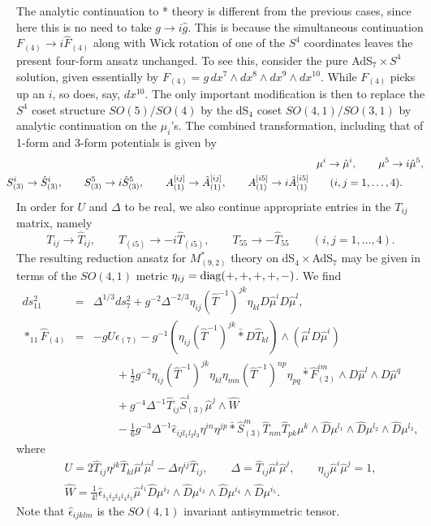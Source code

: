 \documentclass[a4paper,12pt]{article}
\newcommand{\ft}[2]{{\textstyle\frac{#1}{#2}}}
\begin{document}
The analytic continuation to * theory is different from the previous
cases, since here this is no need to take $g\to i\hat g$.  This is
because the simultaneous continuation $F_{(4)}\to i\hat F_{(4)}$ along
with Wick rotation of one of the $S^4$ coordinates leaves the present
four-form ansatz unchanged.  To see this, consider the
pure AdS$_7\times S^4$ solution, given essentially by $F_{(4)}=
g\, dx^7\wedge dx^8\wedge dx^9\wedge dx^{10}$.  While $F_{(4)}$ picks up
an $i$, so does, say, $dx^{10}$.  The only important modification is
then to replace the $S^4$ coset structure $SO(5)/SO(4)$ by the dS$_4$
coset $SO(4,1)/SO(3,1)$ by analytic continuation on the $\mu_i$'s.
The combined transformation, including that of 1-form and 3-form potentials
is given by
%
\begin{eqnarray}
&&\kern-2em
\mu^i\to \hat \mu^i,\qquad \mu^5\to i\hat\mu^5,\nonumber\\
&&\kern-2em
S_{(3)}^i\to \hat S_{(3)}^i, \qquad S_{(3)}^5\to i\hat S_{(3)}^5,\qquad
A_{(1)}^{[ij]}\to \hat A_{(1)}^{[ij]},\qquad
A_{(1)}^{[i5]}\to i\hat A_{(1)}^{[i5]}\qquad (i,j=1,\ldots,4).\qquad
\end{eqnarray}
%
In order for $U$ and $\Delta$ to be real, we also continue
appropriate entries in the $T_{ij}$ matrix, namely
%
\begin{equation}
T_{ij}\to \hat T_{ij},\qquad
T_{(i5)}\to -i\hat T_{(i5)} ,
\qquad T_{55}\to-\hat T_{55}\qquad (i,j=1, \ldots,4).
\end{equation}
%
The resulting reduction ansatz for $M^*_{(9,2)}$ theory on
dS$_4\times$AdS$_7$ may be given in terms of the $SO(4,1)$ metric
$\eta_{ij}={\rm diag}(+,+,+,+,-)$.  We find
%
\begin{eqnarray}
ds^2_{11}&=&\Delta^{1/3}ds_7^2+{g}^{-2}\Delta^{-2/3}
\eta_{ij}(\hat T^{-1})^{jk}\eta_{kl}D\hat\mu^{i}D\hat\mu^{l},\nonumber\\
\ast_{11}\hat{F}_{(4)}&=&-{g}U\epsilon_{(7)}
-{g}^{-1}(\eta_{ij}(\hat T^{-1})^{jk}\bar{\ast}D\hat T_{kl})\wedge
(\hat{\mu}^{l}D\hat\mu^{i})\nonumber\\
&&\qquad+\frac{1}{2}g^{-2}\eta_{ij}(\hat T^{-1})^{jk}\eta_{kl}
\eta_{mn}(\hat T^{-1})^{np}\eta_{pq}\bar{\ast}
\hat{F}^{im}_{(2)} \wedge D\hat\mu^{l} \wedge D\hat\mu^{q}\nonumber\\
&&\qquad
+g^{-4}\Delta^{-1}\hat T_{ij}\hat S_{(3)}^i\hat \mu^j\wedge\hat W\nonumber\\
&&\qquad
-\frac{1}{6}g^{-3}\Delta^{-1}\hat\epsilon_{ijl_1l_2l_3}\eta^{in}\eta^{jp}
\bar\ast\hat S_{(3)}^m \hat T_{nm}\hat T_{pk}\mu^k
\wedge \hat D\mu^{l_1}\wedge \hat D\mu^{l_2} \wedge \hat D\mu^{l_3},
\label{eq:b7redans}
\end{eqnarray}
%
where
%
\begin{eqnarray}
&U=2\hat T_{ij}\eta^{jk}\hat T_{kl} \hat{\mu}^i \hat{\mu}^l
-\Delta \eta^{ij}\hat T_{ij},\qquad
\Delta=\hat T_{ij} \hat{\mu}^i \hat{\mu}^j,\qquad
\eta_{ij}\hat{\mu}^i \hat{\mu}^j = 1,&\nonumber\\
&\hat W=\ft{1}{4!}\hat\epsilon_{i_1i_2i_3i_4i_5}\hat \mu^{i_1}
\hat D\mu^{i_2}\wedge\hat D\mu^{i_3}\wedge \hat D\mu^{i_4}\wedge\hat
D\mu^{i_5}.&
\end{eqnarray}
%
Note that $\hat\epsilon_{ijklm}$ is the $SO(4,1)$ invariant
antisymmetric tensor.
\end{document}
